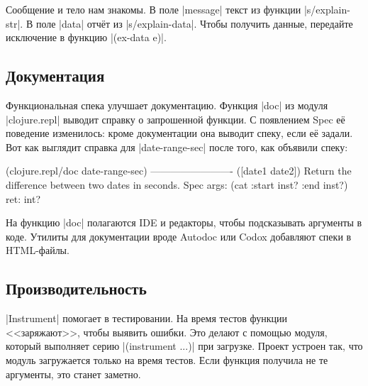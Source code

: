 
Сообщение и тело нам знакомы. В поле \spverb|message| текст из функции
\spverb|s/explain-str|. В поле \spverb|data| отч\"{е}т из
\spverb|s/explain-data|. Чтобы получить данные, передайте исключение в функцию
\spverb|(ex-data e)|.

\subsection{Документация}


Функциональная спека улучшает документацию. Функция \spverb|doc| из модуля
\spverb|clojure.repl| выводит справку о запрошенной функции. С появлением Spec
е\"{е} поведение изменилось: кроме документации она выводит спеку, если е\"{е}
задали. Вот как выглядит справка для \spverb|date-range-sec| после того, как
объявили спеку:

\begin{english}
  \begin{clojure}
(clojure.repl/doc date-range-sec)
-------------------------
([date1 date2])
  Return the difference between two dates in seconds.
Spec
  args: (cat :start inst? :end inst?)
  ret: int?
  \end{clojure}
\end{english}


На функцию \spverb|doc| полагаются IDE и редакторы, чтобы подсказывать аргументы
в коде. Утилиты для документации вроде
Autodoc или
Codox добавляют спеки в
HTML-файлы.

\subsection{Производительность}


\spverb|Instrument| помогает в тестировании. На время тестов функции
<<заряжают>>, чтобы выявить ошибки. Это делают с помощью модуля, который
выполняет серию \spverb|(instrument ...)| при загрузке. Проект устроен так, что
модуль загружается только на время тестов. Если функция получила не те
аргументы, это станет заметно.


